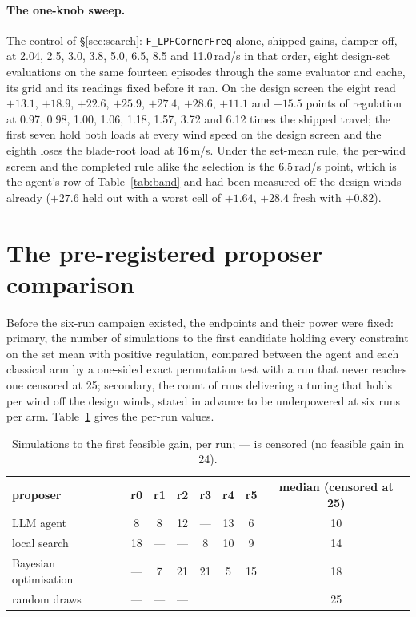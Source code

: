 \documentclass{article}
\begin{document}
\paragraph{The one-knob sweep.} The control of §\ref{sec:search}: \texttt{F\_LPFCornerFreq} alone, shipped gains, damper off, at 2.04, 2.5, 3.0, 3.8, 5.0, 6.5, 8.5 and 11.0\,rad/s in that order, eight design-set evaluations on the same fourteen episodes through the same evaluator and cache, its grid and its readings fixed before it ran. On the design screen the eight read $+13.1$, $+18.9$, $+22.6$, $+25.9$, $+27.4$, $+28.6$, $+11.1$ and $-15.5$ points of regulation at 0.97, 0.98, 1.00, 1.06, 1.18, 1.57, 3.72 and 6.12 times the shipped travel; the first seven hold both loads at every wind speed on the design screen and the eighth loses the blade-root load at 16\,m/s. Under the set-mean rule, the per-wind screen and the completed rule alike the selection is the 6.5\,rad/s point, which is the agent's row of Table~\ref{tab:band} and had been measured off the design winds already ($+27.6$ held out with a worst cell of $+1.64$, $+28.4$ fresh with $+0.82$).

\section{The pre-registered proposer comparison}
\label{app:prereg}
Before the six-run campaign existed, the endpoints and their power were fixed: primary, the number of simulations to the first candidate holding every constraint on the set mean with positive regulation, compared between the agent and each classical arm by a one-sided exact permutation test with a run that never reaches one censored at 25; secondary, the count of runs delivering a tuning that holds per wind off the design winds, stated in advance to be underpowered at six runs per arm. Table~\ref{tab:prereg} gives the per-run values.

\begin{table}[H]
\centering\small
\caption{Simulations to the first feasible gain, per run; --- is censored (no feasible gain in 24).}
\label{tab:prereg}
\begin{tabular}{lcccccc|c}
\toprule
proposer & r0 & r1 & r2 & r3 & r4 & r5 & median (censored at 25) \\
\midrule
LLM agent & 8 & 8 & 12 & --- & 13 & 6 & 10 \\
local search & 18 & --- & --- & 8 & 10 & 9 & 14 \\
Bayesian optimisation & --- & 7 & 21 & 21 & 5 & 15 & 18 \\
random draws & --- & --- & --- & & & & 25 \\
\bottomrule
\end{tabular}
\end{table}
\end{document}
